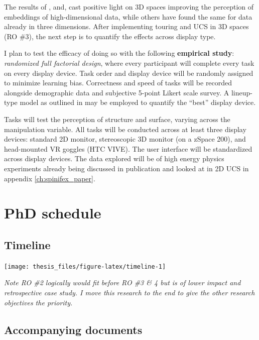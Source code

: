 \documentclass{monashthesis}
\begin{document}
The results of \textcite{wagner_filho_immersive_2018},
\textcite{nelson_xgobi_1998} and, \textcite{arms_benefits_1999} cast
positive light on 3D spaces improving the perception of embeddings of
high-dimensional data, while others have found the same for data already
in three dimensions. After implementing touring and UCS in 3D spaces (RO
\#3), the next step is to quantify the effects across display type.

I plan to test the efficacy of doing so with the following
\textbf{empirical study}: \emph{randomized full factorial design}, where
every participant will complete every task on every display device. Task
order and display device will be randomly assigned to minimize learning
bias. Correctness and speed of tasks will be recorded alongside
demographic data and subjective 5-point Likert scale survey. A
lineup-type model as outlined in \textcite{hofmann_graphical_2012} may
be employed to quantify the ``best'' display device.

Tasks will test the perception of structure and surface, varying across
the manipulation variable. All tasks will be conducted across at least
three display devices: standard 2D monitor, stereoscopic 3D monitor (on
a zSpace 200), and head-mounted VR goggles (HTC VIVE). The user
interface will be standardized across display devices. The data explored
will be of high energy physics experiments already being discussed in
publication \autocites{wang_visualizing_2018}{cook_dynamical_2018} and
looked at in 2D UCS in appendix \ref{ch:spinifex_paper}.

\chapter{PhD schedule}\label{ch:timeline}

\section{Timeline}\label{timeline}

\begin{center}\texttt{[image: thesis\_files/figure-latex/timeline-1]} \end{center}

\emph{Note RO \#2 logically would fit before RO \#3 \& 4 but is of lower
impact and retrospective case study. I move this research to the end to
give the other research objectives the priority.}

\section{Accompanying documents}\label{accompanying-documents}
\end{document}
